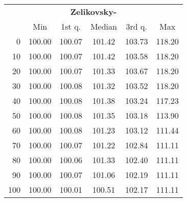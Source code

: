 \begin{tabular}{r|ccccc}
  \multicolumn{6}{c}{{\bf Zelikovsky-}} \\
  & Min & 1st q. & Median & 3rd q. & Max \\ \hline\hline
  0 & 100.00 & 100.07 & 101.42 & 103.73 & 118.20
\\ 10 & 100.00 & 100.07 & 101.42 & 103.58 & 118.20
\\ 20 & 100.00 & 100.07 & 101.33 & 103.67 & 118.20
\\ 30 & 100.00 & 100.08 & 101.32 & 103.52 & 118.20
\\ 40 & 100.00 & 100.08 & 101.38 & 103.24 & 117.23
\\ 50 & 100.00 & 100.08 & 101.35 & 103.18 & 113.90
\\ 60 & 100.00 & 100.08 & 101.23 & 103.12 & 111.44
\\ 70 & 100.00 & 100.07 & 101.22 & 102.84 & 111.11
\\ 80 & 100.00 & 100.06 & 101.33 & 102.40 & 111.11
\\ 90 & 100.00 & 100.07 & 101.06 & 102.19 & 111.11
\\ 100 & 100.00 & 100.01 & 100.51 & 102.17 & 111.11
\end{tabular}
